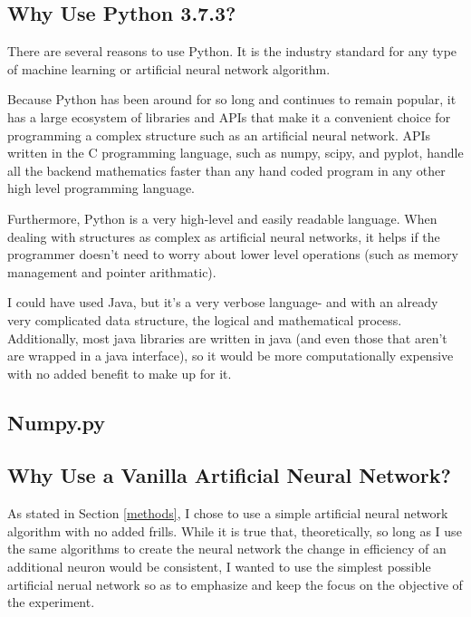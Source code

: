 \documentclass[12pt]{article}
\begin{document}
    \subsection{Why Use Python 3.7.3?}

        There are several reasons to use Python. It is the industry standard for any type of machine learning or artificial neural network algorithm.

        Because Python has been around for so long and continues to remain popular, it has a large ecosystem of libraries and APIs that make it a convenient choice for programming a complex structure such as an artificial neural network. APIs written in the C programming language, such as numpy, scipy, and pyplot, handle all the backend mathematics faster than any hand coded program in any other high level programming language.
    
        Furthermore, Python is a very high-level and easily readable language. When dealing with structures as complex as artificial neural networks, it helps if the programmer doesn't need to worry about lower level operations (such as memory management and pointer arithmatic).

        I could have used Java, but it's a very verbose language- and with an already very complicated data structure, the logical and mathematical process. Additionally, most java libraries are written in java (and even those that aren't are wrapped in a java interface), so it would be more computationally expensive with no added benefit to make up for it.

    \subsection{Numpy.py}

    \subsection{Why Use a Vanilla Artificial Neural Network?
    }

        As stated in Section \ref{methods}, I chose to use a simple artificial neural network algorithm with no added frills. While it is true that, theoretically, so long as I use the same algorithms to create the neural network the change in efficiency of an additional neuron would be consistent, I wanted to use the simplest possible artificial nerual network so as to emphasize and keep the focus on the objective of the experiment. 
\end{document}
